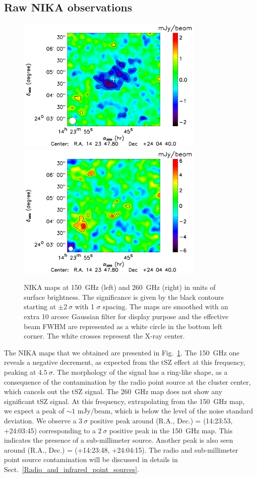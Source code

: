 \documentclass[twocolumn,traditabstract]{aa}
\begin{document}
\subsection{Raw NIKA observations}\label{sec:Raw_NIKA_observations}
\begin{figure}[h]
\centering
\includegraphics[height=6.6cm]{Figure/MACSJ1424_2mm_map.pdf}
\includegraphics[height=6.6cm]{Figure/MACSJ1424_1mm_map.pdf}
\caption{NIKA maps at 150~GHz (left) and 260~GHz (right) in units of surface brightness. The significance is given by the black contours starting at $\pm 2 \ \sigma$ with 1 $\sigma$ spacing. The maps are smoothed with an extra 10 arcsec Gaussian filter for display purpose and the effective beam FWHM are represented as a white circle in the bottom left corner. The white crosses represent the X-ray center.}
\label{fig:flux_map}
\end{figure}
The NIKA maps that we obtained are presented in Fig.~\ref{fig:flux_map}. The 150~GHz one reveals a negative decrement, as expected from the tSZ effect at this frequency, peaking at $4.5 \ \sigma$. The morphology of the signal has a ring-like shape, as a consequence of the contamination by the radio point source at the cluster center, which cancels out the tSZ signal. The 260~GHz map does not show any significant tSZ signal. At this frequency, extrapolating from the 150~GHz map, we expect a peak of $\sim 1$ mJy/beam, which is below the level of the noise standard deviation. We observe a $3 \ \sigma$ positive peak around (R.A., Dec.) = (14:23:53, +24:03:45) corresponding to a $2 \ \sigma$ positive peak in the 150~GHz map. This indicates the presence of a sub-millimeter source. Another peak is also seen around (R.A., Dec.) = (+14:23:48, +24:04:15). The radio and sub-millimeter point source contamination will be discussed in details in Sect.~\ref{Radio_and_infrared_point_sources}.
\end{document}
